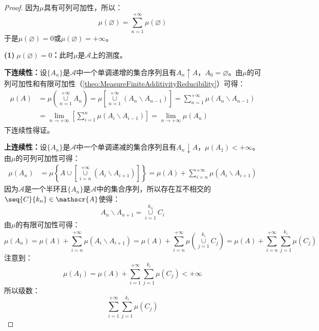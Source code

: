 \begin{proof}
	因为$\mu$具有可列可加性，所以：
	\begin{equation*}
		\mu(\varnothing)=\sum_{n=1}^{+\infty}\mu(\varnothing)
	\end{equation*}
	于是$\mu(\varnothing)=0$或$\mu(\varnothing)=+\infty$。\par
	\textbf{(1)$\;\mu(\varnothing)=0$：}此时$\mu$是$\mathscr{A}$上的测度。\par
	\textbf{下连续性：}设$\{A_n\}$是$\mathscr{A}$中一个单调递增的集合序列且有$A_n\uparrow A$，$A_0=\varnothing$。由$\mu$的可列可加性和有限可加性（\cref{theo:MeasureFiniteAdditivityReducibility}）可得：
	\begin{align*}
		\mu(A)&=\mu\left(\underset{n=1}{\overset{+\infty}{\cup}}A_n\right)
		=\mu\left[\underset{n=1}{\overset{+\infty}{\cup}}(A_{n}\backslash A_{n-1})\right] =\sum_{n=1}^{+\infty}\mu(A_n\backslash A_{n-1}) \\
		&=\lim_{n\to+\infty}\left[\sum_{i=1}^{n}\mu(A_i\backslash A_{i-1})\right]
		=\lim_{n\to+\infty}\mu(A_n)
	\end{align*}
	下连续性得证。\par
	\textbf{上连续性：}设$\{A_n\}$是$\mathscr{A}$中一个单调递减的集合序列且有$A_n\downarrow A$，$\mu(A_1)<+\infty$。由$\mu$的可列可加性可得：
	\begin{align*}
		\mu(A_n)&=\mu\left\{A\cup\left[\underset{i=n}{\overset{+\infty}{\cup}}(A_i\backslash A_{i+1})\right]\right\}
		=\mu(A)+\sum_{i=n}^{+\infty}\mu(A_i\backslash A_{i+1})
	\end{align*}
	因为$\mathscr{A}$是一个半环且$\{A_n\}$是$\mathscr{A}$中的集合序列，所以存在互不相交的$\seq{C}{k_n}\in \mathscr{A}$使得：
	\begin{equation*}
		A_n\backslash A_{n+1}=\underset{i=1}{\overset{k_n}{\cup}}C_i
	\end{equation*}
	由$\mu$的有限可加性可得：
	\begin{equation*}
		\mu(A_n)=\mu(A)+\sum_{i=n}^{+\infty}\mu(A_i\backslash A_{i+1})=\mu(A)+\sum_{i=n}^{+\infty}\mu\left(\underset{j=1}{\overset{k_i}{\cup}}C_j\right)=\mu(A)+\sum_{i=n}^{+\infty}\sum_{j=1}^{k_i}\mu(C_j)
	\end{equation*}
	注意到：
	\begin{equation*}
		\mu(A_1)=\mu(A)+\sum_{i=1}^{+\infty}\sum_{j=1}^{k_i}\mu(C_j)<+\infty
	\end{equation*}
	所以级数：
	\begin{equation*}
		\sum_{i=1}^{+\infty}\sum_{j=1}^{k_i}\mu(C_j)
	\end{equation*}

\end{proof}

